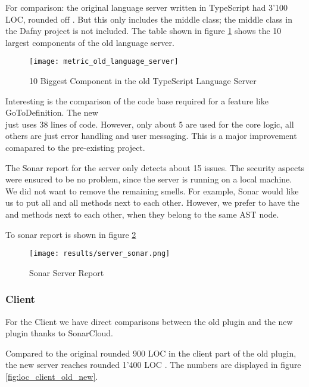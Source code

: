 For comparison: the original language server written in TypeScript had 3'100 LOC, rounded off \cite{sonar-old_ts_server}.
But this only includes the middle class; the middle class in the Dafny project is not included.
The table shown in figure \ref{fig:old_ts_languageserver} shows the 10 largest components of the old language server. \\

\begin{figure}[H]
    \centering
    \texttt{[image: metric\_old\_language\_server]}
    \caption{10 Biggest Component in the old TypeScript Language Server}
    \label{fig:old_ts_languageserver}
\end{figure}

Interesting is the comparison of the code base required for a feature like GoToDefinition.
The new \\
 just uses 38 lines of code.
However, only about 5 are used for the core logic, all others are just error handling and user messaging.
This is a major improvement comapared to the pre-existing project.

The Sonar report for the server only detects about 15 issues.
The security aspects were ensured to be no problem, since the server is running on a local machine.
We did not want to remove the remaining smells.
For example, Sonar would like us to put all  and all  methods next to each other.
However, we prefer to have the  and  methods next to each other, when they belong to the same AST node.

To sonar report is shown in figure \ref{fig:sonarserver}

\begin{figure}[H]
    \centering
    \texttt{[image: results/server\_sonar.png]}
    \caption{Sonar Server Report}
    \label{fig:sonarserver}
\end{figure}


\subsubsection{Client}
For the Client we have direct comparisons between the old plugin and the new plugin thanks to SonarCloud.

Compared to the original rounded 900 LOC \cite{sonar-client_old} in the client part of the old plugin,
the new server reaches rounded 1'400 LOC \cite{sonar-client_new}.
The numbers are displayed in figure \ref{fig:loc_client_old_new}.

